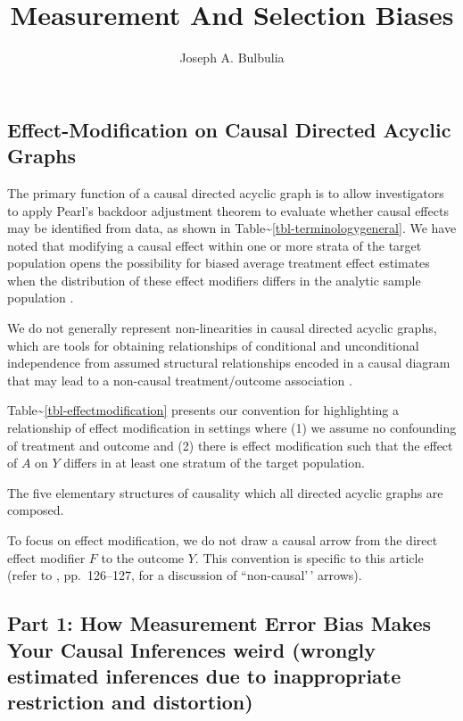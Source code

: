 \documentclass[
  ignorenonframetext,
  aspectratio=169,
]{beamer}
\title{Measurement And Selection Biases}
\author{Joseph A. Bulbulia}
\date{}
\begin{document}
\frame{\titlepage}


\begin{frame}
\section{Effect-Modification on Causal Directed Acyclic Graphs}

The primary function of a causal directed acyclic graph is to allow
investigators to apply Pearl's backdoor adjustment theorem to evaluate
whether causal effects may be identified from data, as shown in
Table\textasciitilde{}\ref{tbl-terminologygeneral}. We have noted that
modifying a causal effect within one or more strata of the target
population opens the possibility for biased average treatment effect
estimates when the distribution of these effect modifiers differs in the
analytic sample population \citep{bulbulia2024swigstime}.

We do not generally represent non-linearities in causal directed acyclic
graphs, which are tools for obtaining relationships of conditional and
unconditional independence from assumed structural relationships encoded
in a causal diagram that may lead to a non-causal treatment/outcome
association \citep{bulbulia2023}.

Table\textasciitilde{}\ref{tbl-effectmodification} presents our
convention for highlighting a relationship of effect modification in
settings where (1) we assume no confounding of treatment and outcome and
(2) there is effect modification such that the effect of \(A\) on \(Y\)
differs in at least one stratum of the target population.

\begin{table}[ht]
\centering
\terminologyeffectmodification
\caption{The five elementary structures of causality which all directed acyclic graphs are composed.}
\label{tbl-effectmodification}
\end{table}

To focus on effect modification, we do not draw a causal arrow from the
direct effect modifier \(F\) to the outcome \(Y\). This convention is
specific to this article (refer to \citealt{hernan2024WHATIF},
pp.~126--127, for a discussion of ``non-causal'\,' arrows).

\subsection{Part 1: How Measurement Error Bias Makes Your Causal Inferences \textbf{weird} (wrongly estimated inferences due to inappropriate restriction and distortion)}


\end{frame}
\end{document}
